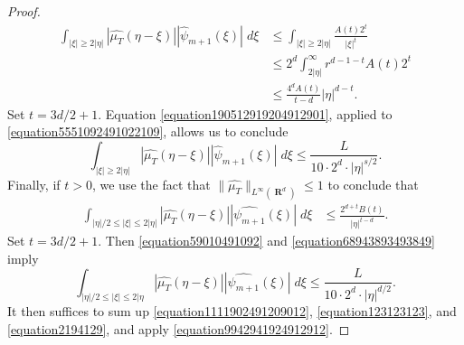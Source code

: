 \documentclass[12pt,reqno]{article}
\numberwithin{equation}{section}
\DeclareMathOperator{\RR}{\mathbf{R}}
\begin{document}
\begin{proof}
\begin{equation}
    \begin{split}
        \int_{|\xi| \geq 2|\eta|} |\widehat{\mu_T}(\eta - \xi)| |\widehat{\psi}_{m+1}(\xi)|\; d\xi &\leq \int_{|\xi| \geq 2|\eta|} \frac{A(t) 2^t}{|\xi|^t}\\
        &\leq 2^d \int_{2|\eta|}^\infty r^{d-1 - t} A(t) 2^t\\
        &\leq \frac{4^d A(t)}{t - d} |\eta|^{d-t}.
    \end{split}
    \end{equation}
    Set $t = 3d/2 + 1$. Equation \eqref{equation190512919204912901}, applied to \eqref{equation5551092491022109}, allows us to conclude
    \begin{equation} \label{equation123123123}
        \int_{|\xi| \geq 2|\eta|} |\widehat{\mu_T}(\eta - \xi)| |\widehat{\psi}_{m+1}(\xi)|\; d\xi \leq \frac{L}{10 \cdot 2^d \cdot |\eta|^{s/2}}.
    \end{equation}
    Finally, if $t > 0$, we use the fact that $\| \widehat{\mu_T} \|_{L^\infty(\RR^d)} \leq 1$ to conclude that
    \begin{equation} \label{equation59010491092}
    \begin{split}
        \int_{|\eta|/2 \leq |\xi| \leq 2|\eta|} |\widehat{\mu_T}(\eta - \xi)| |\widehat{\psi_{m+1}}(\xi)|\; d\xi &\leq \frac{2^{d+t} B(t)}{|\eta|^{t-d}}.
    \end{split}
    \end{equation}
    Set $t = 3d/2 + 1$. Then \eqref{equation59010491092} and \eqref{equation68943893493849} imply
    \begin{equation} \label{equation2194129}
        \int_{|\eta|/2 \leq |\xi| \leq 2|\eta} |\widehat{\mu_T}(\eta - \xi)| |\widehat{\psi_{m+1}}(\xi)|\; d\xi \leq \frac{L}{10 \cdot 2^d \cdot |\eta|^{d/2}}.
    \end{equation}
    It then suffices to sum up \eqref{equation1111902491209012}, \eqref{equation123123123}, and \eqref{equation2194129}, and apply \eqref{equation9942941924912912}.
\end{proof}
\end{document}
